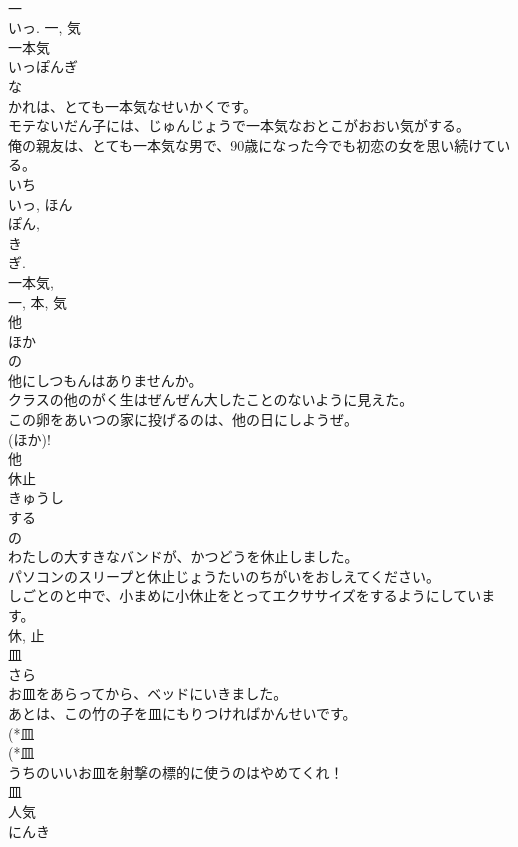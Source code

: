\documentclass[8pt]{extreport}
\begin{document}
\begin{CJK}{UTF8}{min}
\\	一 
\\	いっ.	一, 気	
\\	一本気	
\\	いっぽんぎ	
\\	な 
\\	かれは、とても一本気なせいかくです。	
\\	モテないだん子には、じゅんじょうで一本気なおとこがおおい気がする。	
\\	俺の親友は、とても一本気な男で、90歳になった今でも初恋の女を思い続けている。	
\\	いち 
\\	いっ, ほん 
\\	ぽん, 
\\	き 
\\	ぎ. 
\\	一本気, 
\\	一, 本, 気	
\\	他	
\\	ほか	
\\	の 
\\	他にしつもんはありませんか。	
\\	クラスの他のがく生はぜんぜん大したことのないように見えた。	
\\	この卵をあいつの家に投げるのは、他の日にしようぜ。	
\\	(ほか)! 
\\	他	
\\	休止	
\\	きゅうし	
\\	する 
\\	の 
\\	わたしの大すきなバンドが、かつどうを休止しました。	
\\	パソコンのスリープと休止じょうたいのちがいをおしえてください。	
\\	しごとのと中で、小まめに小休止をとってエクササイズをするようにしています。	
\\	休, 止	
\\	皿	
\\	さら	
\\	お皿をあらってから、ベッドにいきました。	
\\	あとは、この竹の子を皿にもりつければかんせいです。
\\	(*皿
\\	(*皿
\\	うちのいいお皿を射撃の標的に使うのはやめてくれ！	
\\	皿	
\\	人気	
\\	にんき	

\end{CJK}
\end{document}
